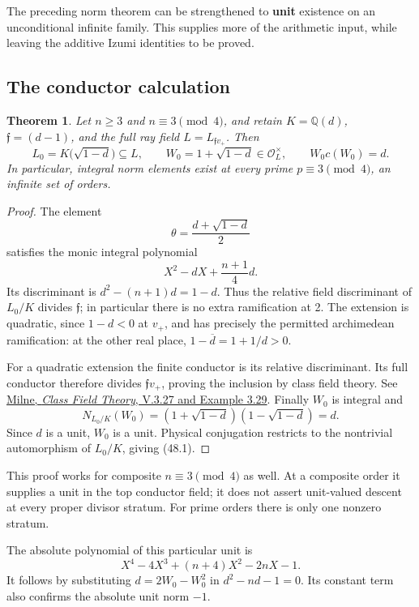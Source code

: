 \documentclass[11pt,reqno]{amsart}
\theoremstyle{plain}
\newtheorem{theorem}{Theorem}[section]
\begin{document}
The preceding norm theorem can be strengthened to \textbf{unit} existence on
an unconditional infinite family. This supplies more of the arithmetic
input, while leaving the additive Izumi identities to be proved.

\subsection{The conductor calculation}\label{sec:48.1}

\begin{theorem}
Let \(n\ge3\) and \(n\equiv3\pmod4\), and retain
\(K=\mathbb Q(d)\), \(\mathfrak f=(d-1)\), and the full ray field
\(L=L_{\mathfrak f v_+}\). Then
\begin{equation*}
 L_0=K\bigl(\sqrt{1-d}\bigr)\subseteq L,
 \qquad
 W_0=1+\sqrt{1-d}\in\mathcal O_L^\times,
 \qquad W_0c(W_0)=d. \tag{48.1}
\end{equation*}
In particular, integral norm elements exist at every prime
\(p\equiv3\pmod4\), an infinite set of orders.
\end{theorem}

\begin{proof}
The element
\[
 \theta=\frac{d+\sqrt{1-d}}2
\]
satisfies the monic integral polynomial
\[
 X^2-dX+\frac{n+1}{4}d.
\]
Its discriminant is
\(d^2-(n+1)d=1-d\). Thus the relative field discriminant of
\(L_0/K\) divides \(\mathfrak f\); in particular there is no
extra ramification at 2. The extension is quadratic, since
\(1-d<0\) at \(v_+\), and has precisely the permitted
archimedean ramification: at the other real place,
\(1-\overline d=1+1/d>0\).

For a quadratic extension the finite conductor is its relative
discriminant. Its full conductor therefore divides
\(\mathfrak f v_+\), proving the inclusion by class field theory.
See \href{https://www.jmilne.org/math/CourseNotes/CFT.pdf}{Milne, \emph{Class Field Theory}, V.3.27 and Example 3.29}.
Finally \(W_0\) is integral and
\[
 N_{L_0/K}(W_0)=(1+\sqrt{1-d})(1-\sqrt{1-d})=d.
\]
Since \(d\) is a unit, \(W_0\) is a unit. Physical conjugation
restricts to the nontrivial automorphism of \(L_0/K\), giving
(48.1).
\end{proof}

This proof works for composite \(n\equiv3\pmod4\) as well. At a
composite order it supplies a unit in the top conductor field; it
does not assert unit-valued descent at every proper divisor stratum.
For prime orders there is only one nonzero stratum.

The absolute polynomial of this particular unit is
\[
 X^4-4X^3+(n+4)X^2-2nX-1.
\]
It follows by substituting \(d=2W_0-W_0^2\) in
\(d^2-nd-1=0\). Its constant term also confirms the absolute
unit norm \(-1\).
\end{document}
